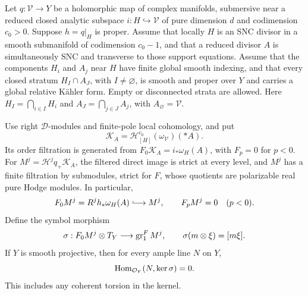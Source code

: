\begin{proposition}\label{signed:localized-hodge}
Let \(q:\mathscr V\to Y\) be a holomorphic map of complex
manifolds, submersive near a reduced closed analytic subspace
\(i:H\hookrightarrow\mathscr V\) of pure dimension \(d\) and
codimension \(c_0>0\).  Suppose \(h=q|_H\) is proper.  Assume
that locally \(H\) is an SNC divisor in a smooth submanifold of
codimension \(c_0-1\), and that a reduced divisor \(A\) is
simultaneously SNC and transverse to those support equations.
Assume that the components \(H_i\) and \(A_j\) near \(H\) have
finite global smooth indexing, and that every closed stratum
\(H_I\cap A_J\), with \(I\ne\varnothing\), is smooth and proper
over \(Y\) and carries a global relative Kähler form.  Empty or
disconnected strata are allowed.
Here \(H_I=\bigcap_{i\in I}H_i\) and
\(A_J=\bigcap_{j\in J}A_j\), with \(A_\varnothing=\mathscr V\).

Use right \(\mathscr D\)-modules and finite-pole local cohomology,
and put
\[
 \mathcal K_A=\mathcal H^{c_0}_{[H]}(\omega_{\mathscr V})(*A).
\]
Its order filtration is generated from
\(F_0\mathcal K_A=i_*\omega_H(A)\), with \(F_p=0\) for \(p<0\).
For \(M^j=\mathcal H^j q_+\mathcal K_A\), the filtered direct
image is strict at every level, and \(M^j\) has a finite
filtration by submodules, strict for \(F\), whose quotients are
polarizable real pure Hodge modules.  In particular,
\begin{equation}\label{signed:lowest-step}
 F_0M^j=R^jh_*\omega_H(A)\lhook\joinrel\longrightarrow M^j,
 \qquad F_pM^j=0\quad(p<0).
\end{equation}
Define the symbol morphism
\[
 \sigma:F_0M^j\otimes T_Y\longrightarrow\operatorname{gr}^F_1M^j,
 \qquad \sigma(m\otimes\xi)=[m\xi].
\]
If \(Y\) is smooth projective, then for every ample line \(N\) on \(Y\),
\begin{equation}\label{signed:symbol-vanishing}
 \operatorname{Hom}_{\mathcal O_Y}(N,\operatorname{ker}\sigma)=0.
\end{equation}
This includes any coherent torsion in the kernel.
\end{proposition}

